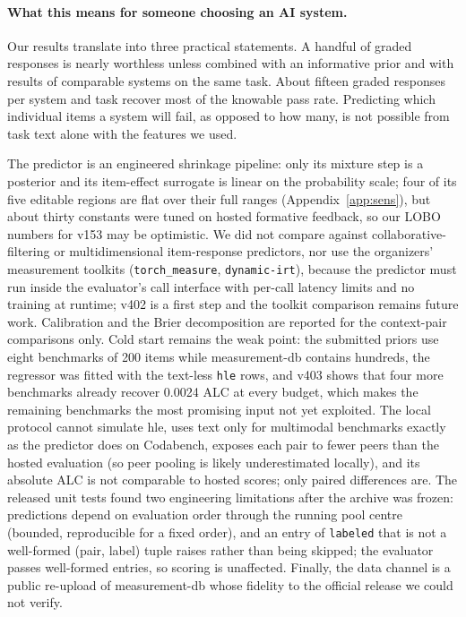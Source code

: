 \documentclass{article}
\begin{document}
\paragraph{What this means for someone choosing an AI system.} Our results translate into three practical statements. A handful of graded responses is nearly worthless unless combined with an informative prior and with results of comparable systems on the same task. About fifteen graded responses per system and task recover most of the knowable pass rate. Predicting which individual items a system will fail, as opposed to how many, is not possible from task text alone with the features we used.

The predictor is an engineered shrinkage pipeline: only its mixture step is a posterior and its item-effect surrogate is linear on the probability scale; four of its five editable regions are flat over their full ranges (Appendix~\ref{app:sens}), but about thirty constants were tuned on hosted formative feedback, so our LOBO numbers for v153 may be optimistic. We did not compare against collaborative-filtering or multidimensional item-response predictors, nor use the organizers' measurement toolkits (\texttt{torch\_measure}, \texttt{dynamic-irt}), because the predictor must run inside the evaluator's call interface with per-call latency limits and no training at runtime; v402 is a first step and the toolkit comparison remains future work. Calibration and the Brier decomposition are reported for the context-pair comparisons only. Cold start remains the weak point: the submitted priors use eight benchmarks of 200 items while measurement-db contains hundreds, the regressor was fitted with the text-less \texttt{hle} rows, and v403 shows that four more benchmarks already recover 0.0024 ALC at every budget, which makes the remaining benchmarks the most promising input not yet exploited. The local protocol cannot simulate hle, uses text only for multimodal benchmarks exactly as the predictor does on Codabench, exposes each pair to fewer peers than the hosted evaluation (so peer pooling is likely underestimated locally), and its absolute ALC is not comparable to hosted scores; only paired differences are. The released unit tests found two engineering limitations after the archive was frozen: predictions depend on evaluation order through the running pool centre (bounded, reproducible for a fixed order), and an entry of \texttt{labeled} that is not a well-formed (pair, label) tuple raises rather than being skipped; the evaluator passes well-formed entries, so scoring is unaffected. Finally, the data channel is a public re-upload of measurement-db whose fidelity to the official release we could not verify.
\end{document}
